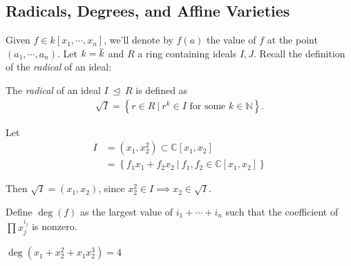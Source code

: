 \hypertarget{radicals-degrees-and-affine-varieties}{%
\subsection{Radicals, Degrees, and Affine
Varieties}\label{radicals-degrees-and-affine-varieties}}

Given \(f\in k[x_1, \cdots, x_n]\), we'll denote by \(f(a)\) the value
of \(f\) at the point \((a_1, \cdots, a_n)\). Let
\(k = \mkern 1.5mu\overline{\mkern-1.5muk\mkern-1.5mu}\mkern 1.5mu\) and
\(R\) a ring containing ideals \(I, J\). Recall the definition of the
\emph{radical} of an ideal:

\begin{definition}[Radical]

The \emph{radical} of an ideal \(I {~\trianglelefteq~}R\) is defined as
\begin{align*}  
\sqrt{I} = \left\{{r\in R {~\mathrel{\Big|}~}r^k\in I \text{ for some } k\in {\mathbb{N}}}\right\}
.\end{align*}

\end{definition}

\begin{example}

Let
\begin{align*}
I &= (x_1, x_2^2) \subset {\mathbb{C}}[x_1, x_2] \\
  &= \left\{{ f_1 x_1 + f_2 x_2 {~\mathrel{\Big|}~}f_1, f_2 \in {\mathbb{C}}[x_1, x_2]}\right\}
\end{align*}

Then \(\sqrt{I} = (x_1, x_2)\), since
\(x_2^2 \in I \implies x_2 \in \sqrt{I}\).

\end{example}

\begin{definition}

Define \(\deg(f)\) as the largest value of \(i_1 + \cdots + i_n\) such
that the coefficient of \(\prod x_j ^{i_j}\) is nonzero.

\end{definition}

\begin{example}

\(\deg(x_1 + x_2^2 + x_1 x_2^3) = 4\)

\end{example}

